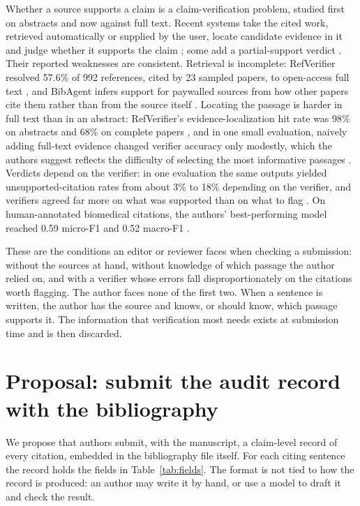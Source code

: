 \documentclass[11pt]{article}
\begin{document}
Whether a source supports a claim is a claim-verification problem, studied first on abstracts \citep{wadden2020scifact} and now against full text. Recent systems take the cited work, retrieved automatically or supplied by the user, locate candidate evidence in it and judge whether it supports the claim \citep{haan2025semanticcite,mocan2026refverifier,sadeghi2026deepsciverify,lee2026reflens,li2026bibagent}; some add a partial-support verdict \citep{haan2025semanticcite,mocan2026refverifier}. Their reported weaknesses are consistent. Retrieval is incomplete: RefVerifier resolved 57.6\% of 992 references, cited by 23 sampled papers, to open-access full text \citep{mocan2026refverifier}, and BibAgent infers support for paywalled sources from how other papers cite them rather than from the source itself \citep{li2026bibagent}. Locating the passage is harder in full text than in an abstract: RefVerifier's evidence-localization hit rate was 98\% on abstracts and 68\% on complete papers \citep{mocan2026refverifier}, and in one small evaluation, naively adding full-text evidence changed verifier accuracy only modestly, which the authors suggest reflects the difficulty of selecting the most informative passages \citep{sadeghi2026deepsciverify}. Verdicts depend on the verifier: in one evaluation the same outputs yielded unsupported-citation rates from about 3\% to 18\% depending on the verifier, and verifiers agreed far more on what was supported than on what to flag \citep{goo2026citefaithfulness}. On human-annotated biomedical citations, the authors' best-performing model reached 0.59 micro-F1 and 0.52 macro-F1 \citep{sarol2024citationintegrity}.

These are the conditions an editor or reviewer faces when checking a submission: without the sources at hand, without knowledge of which passage the author relied on, and with a verifier whose errors fall disproportionately on the citations worth flagging. The author faces none of the first two. When a sentence is written, the author has the source and knows, or should know, which passage supports it. The information that verification most needs exists at submission time and is then discarded.

\section{Proposal: submit the audit record with the bibliography}

We propose that authors submit, with the manuscript, a claim-level record of every citation, embedded in the bibliography file itself. For each citing sentence the record holds the fields in Table~\ref{tab:fields}. The format is not tied to how the record is produced: an author may write it by hand, or use a model to draft it and check the result.
\end{document}
